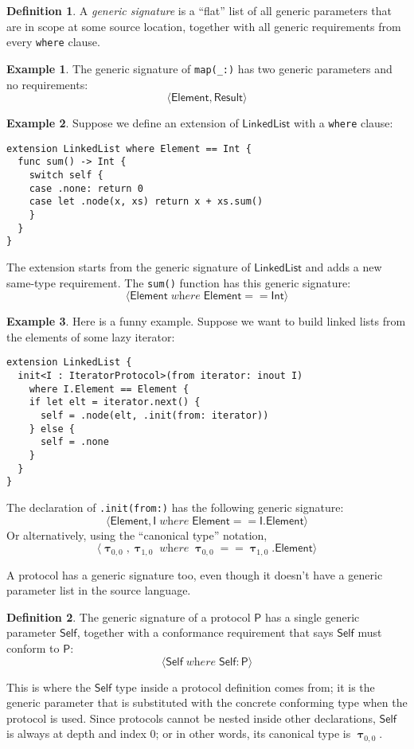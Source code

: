 \documentclass[headsepline,bibliography=totoc]{scrreport}
\newcommand{\namesym}[1]{\mathsf{#1}}
\newcommand{\genericparam}[1]{\bm{\mathsf{#1}}}
\newcommand{\proto}[1]{\bm{\mathsf{#1}}}
\newcommand{\gensig}[2]{\langle #1\;\textit{where}\;#2\rangle}
\newcommand{\genericsym}[2]{\bm{\uptau}_{#1,#2}}
\theoremstyle{definition}
\newtheorem{example}{Example}[chapter]
\theoremstyle{definition}
\newtheorem{definition}{Definition}[chapter]
\theoremstyle{definition}
\begin{document}
\begin{definition} A \emph{generic signature} is a ``flat'' list of all generic parameters that are in scope at some source location, together with all generic requirements from every \texttt{where} clause.
\end{definition}
\begin{example}
The generic signature of \texttt{map(\_:)} has two generic parameters and no requirements:
\[\langle\genericparam{Element}, \genericparam{Result}\rangle\]
\end{example}
\begin{example}
Suppose we define an extension of $\namesym{LinkedList}$ with a \texttt{where} clause:
\begin{Verbatim}
extension LinkedList where Element == Int {
  func sum() -> Int {
    switch self {
    case .none: return 0
    case let .node(x, xs) return x + xs.sum()
    }
  }
}
\end{Verbatim}
The extension starts from the generic signature of $\namesym{LinkedList}$ and adds a new same-type requirement. The \texttt{sum()} function has this generic signature:
\[\gensig{\genericparam{Element}}{\genericparam{Element}==\namesym{Int}}\]
\end{example}
\begin{example}
Here is a funny example. Suppose we want to build linked lists from the elements of some lazy iterator:
\begin{Verbatim}
extension LinkedList {
  init<I : IteratorProtocol>(from iterator: inout I)
    where I.Element == Element {
    if let elt = iterator.next() {
      self = .node(elt, .init(from: iterator))
    } else {
      self = .none
    }
  }
}
\end{Verbatim}
The declaration of \texttt{.init(from:)} has the following generic signature:
\[\gensig{\genericparam{Element}, \genericparam{I}}{\genericparam{Element}==\genericparam{I}.\namesym{Element}}\]
Or alternatively, using the ``canonical type'' notation,
\[\gensig{\genericsym{0}{0}, \genericsym{1}{0}}{\genericsym{0}{0}==\genericsym{1}{0}.\namesym{Element}}\]
\end{example}

A protocol has a generic signature too, even though it doesn't have a generic parameter list in the source language.

\begin{definition}
The generic signature of a protocol $\proto{P}$ has a single generic parameter $\genericparam{Self}$, together with a conformance requirement that says $\genericparam{Self}$ must conform to $\proto{P}$:
\[\gensig{\genericparam{Self}}{\genericparam{Self}\colon\proto{P}}\]
\end{definition}
This is where the $\genericparam{Self}$ type inside a protocol definition comes from; it is the generic parameter that is substituted with the concrete conforming type when the protocol is used. Since protocols cannot be nested inside other declarations, $\genericparam{Self}$ is always at depth and index 0; or in other words, its canonical type is $\genericsym{0}{0}$.
\end{document}
